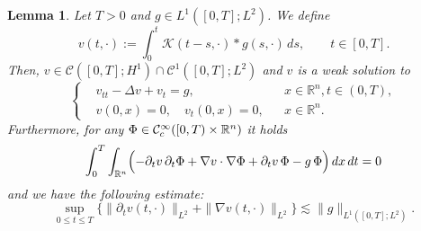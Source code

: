 \documentclass[10pt,a4paper]{amsart}
\newtheorem{lemma}{Lemma}
\begin{document}
	\begin{lemma}\label{regularity_K}
		Let $T>0$ and $g\in L^1([0,T];L^2)$. We define
		\[
		v(t,\cdot):=\int_0^t\mathcal K(t-s,\cdot)\ast g(s,\cdot)\,ds,
		\qquad t\in[0,T].
		\]
		Then, $v\in \mathcal{C}([0,T];H^1)\cap \mathcal{C}^1([0,T];L^2)$ and $v$ is a weak solution to 
		\[
		\left\{
		\begin{aligned}
			&v_{tt}-\Delta v+ v_t= g,&&x\in \mathbb R^n,t\in (0,T),\\
			&v(0,x)=0, \quad v_t(0,x)=0,&&x\in \mathbb R^n.
		\end{aligned}
		\right.
		\]
		Furthermore, for any
		$\Phi\in \mathcal{C}^\infty_{\rm c}([0,T)\times\mathbb R^n)$ it holds
		\begin{equation}\label{duhamel_distribution_identity}
			\int_0^T\int_{\mathbb R^n}\Bigl(-\partial_tv\,\partial_t\Phi+\nabla v\cdot\nabla\Phi+\partial_tv\,\Phi- g\,\Phi\Bigr)\,dx\,dt=0
		\end{equation}
		and we have the following estimate:
		\begin{equation}\label{Energy_Est}
			\sup_{0\leq t\leq T}\big\{\|\partial_tv(t,\cdot)\|_{L^2}+\|\nabla v(t,\cdot)\|_{L^2}\big\}\lesssim \|g\|_{L^1([0,T];L^2)}.
		\end{equation}
	\end{lemma}
\end{document}

